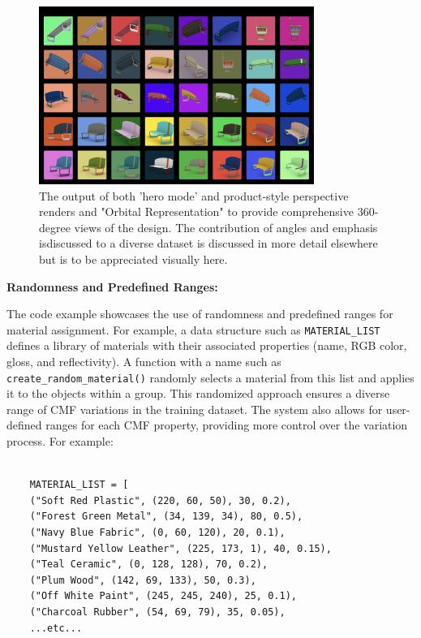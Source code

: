 \documentclass[12pt]{report}
\begin{document}
\begin{figure}[h]
    \centering
    \includegraphics[width=0.8\textwidth]{figures/figure-process-orbital-and-hero-shot-combined-color.jpg} 
    \caption{The output of both 'hero mode' and product-style perspective renders and "Orbital Representation" to provide comprehensive 360-degree views of the design. The contribution of angles and emphasis isdiscussed to a diverse dataset is discussed in more detail elsewhere but is to be appreciated visually here.}
    \label{fig:render_mode_selection}
\end{figure}

\textbf{Randomness and Predefined Ranges:}

The code example showcases the use of randomness and predefined ranges for material assignment. For example, a data structure such as \texttt{MATERIAL\_LIST} defines a library of materials with their associated properties (name, RGB color, gloss, and reflectivity). A function with a name such as \texttt{create\_random\_material()} randomly selects a material from this list and applies it to the objects within a group. This randomized approach ensures a diverse range of CMF variations in the training dataset. The system also allows for user-defined ranges for each CMF property, providing more control over the variation process. For example:

        \begin{verbatim}
        
    MATERIAL_LIST = [
    ("Soft Red Plastic", (220, 60, 50), 30, 0.2),
    ("Forest Green Metal", (34, 139, 34), 80, 0.5),
    ("Navy Blue Fabric", (0, 60, 120), 20, 0.1),
    ("Mustard Yellow Leather", (225, 173, 1), 40, 0.15),
    ("Teal Ceramic", (0, 128, 128), 70, 0.2),
    ("Plum Wood", (142, 69, 133), 50, 0.3),
    ("Off White Paint", (245, 245, 240), 25, 0.1),
    ("Charcoal Rubber", (54, 69, 79), 35, 0.05),
    ...etc...
\end{verbatim}
\end{document}
